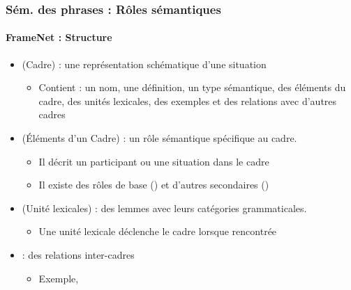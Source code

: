 \documentclass[xcolor=table]{beamer}
\begin{document}
\begin{frame}
	\frametitle{Sém. des phrases : Rôles sémantiques}
	\framesubtitle{FrameNet : Structure}
	
	\begin{itemize}
		\item {} (Cadre) : une représentation schématique d'une situation
		\begin{itemize}
			\item Contient : un nom, une définition, un type sémantique, des éléments du cadre, des unités lexicales, des exemples et des relations avec d'autres cadres
		\end{itemize}
	
		\item {} (Éléments d'un Cadre) : un rôle sémantique spécifique au cadre. 
		\begin{itemize}
			\item Il décrit un participant ou une situation dans le cadre
			\item Il existe des rôles de base () et d'autres secondaires ()
		\end{itemize}
	
		\item {} (Unité lexicales) : des lemmes avec leurs catégories grammaticales.
		\begin{itemize}
			\item Une unité lexicale déclenche le cadre lorsque rencontrée
		\end{itemize}
	
		\item {} : des  relations inter-cadres
		\begin{itemize}
			\item Exemple, 
		\end{itemize}
	\end{itemize}
	
\end{frame}
\end{document}
